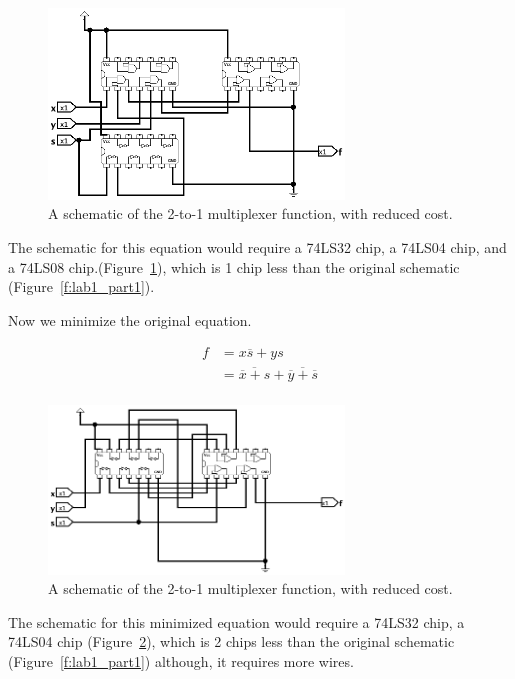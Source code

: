 \documentclass{article}
\begin{document}
\begin{enumerate}
\begin{figure}[!ht]
    \centering
    \includegraphics[width=0.7\textwidth]{lab1_part1_cheaper.png}
    \caption{A schematic of the 2-to-1 multiplexer function, with reduced cost.}
    \label{f:lab1_part1_cheaper}
\end{figure}
\newpage

The schematic for this equation would require a 74LS32 chip, a 74LS04 chip, and a 74LS08 chip.(Figure~\ref{f:lab1_part1_cheaper}), which is 1 chip less than the original schematic (Figure~\ref{f:lab1_part1}).

Now we minimize the original equation.

\begin{align*}
    f   &= x\overline{s}+ys\\
        &= \overline{\overline{x} + s}+\overline{\overline{y} + \overline{s}} \tag{De Morgan's Laws}\\
\end{align*}

\begin{figure}[!ht]
    \centering
    \includegraphics[width=0.7\textwidth]{lab1_part1_cheapest.png}
    \caption{A schematic of the 2-to-1 multiplexer function, with reduced cost.}
    \label{f:lab1_part1_cheapest}
\end{figure}
The schematic for this minimized equation would require a 74LS32 chip, a 74LS04 chip (Figure~\ref{f:lab1_part1_cheapest}), which is 2 chips less than the original schematic (Figure~\ref{f:lab1_part1}) although, it requires more wires.
\end{enumerate}
\end{document}
